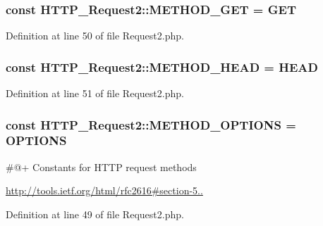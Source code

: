 \subsubsection[{M\+E\+T\+H\+O\+D\+\_\+\+G\+E\+T}]{\setlength{\rightskip}{0pt plus 5cm}const H\+T\+T\+P\+\_\+\+Request2\+::\+M\+E\+T\+H\+O\+D\+\_\+\+G\+E\+T = \textquotesingle{}G\+E\+T\textquotesingle{}}\label{classHTTP__Request2_a7c1f37cc2543c9d0fe5f09086bd50b3a}


Definition at line 50 of file Request2.\+php.

\hypertarget{classHTTP__Request2_abb68a728946a9da5f19d5bb0cf676d58}{}
\subsubsection[{M\+E\+T\+H\+O\+D\+\_\+\+H\+E\+A\+D}]{\setlength{\rightskip}{0pt plus 5cm}const H\+T\+T\+P\+\_\+\+Request2\+::\+M\+E\+T\+H\+O\+D\+\_\+\+H\+E\+A\+D = \textquotesingle{}H\+E\+A\+D\textquotesingle{}}\label{classHTTP__Request2_abb68a728946a9da5f19d5bb0cf676d58}


Definition at line 51 of file Request2.\+php.

\hypertarget{classHTTP__Request2_a65c57cec36149d220f6cd30d43eb59b7}{}
\subsubsection[{M\+E\+T\+H\+O\+D\+\_\+\+O\+P\+T\+I\+O\+N\+S}]{\setlength{\rightskip}{0pt plus 5cm}const H\+T\+T\+P\+\_\+\+Request2\+::\+M\+E\+T\+H\+O\+D\+\_\+\+O\+P\+T\+I\+O\+N\+S = \textquotesingle{}O\+P\+T\+I\+O\+N\+S\textquotesingle{}}\label{classHTTP__Request2_a65c57cec36149d220f6cd30d43eb59b7}
\#@+ Constants for H\+T\+T\+P request methods

\hyperlink{}{http\+://tools.\+ietf.\+org/html/rfc2616\#section-\/5..}

Definition at line 49 of file Request2.\+php.

\hypertarget{classHTTP__Request2_ae42a6ae396ef8abacf8e54a64a64df22}{}
